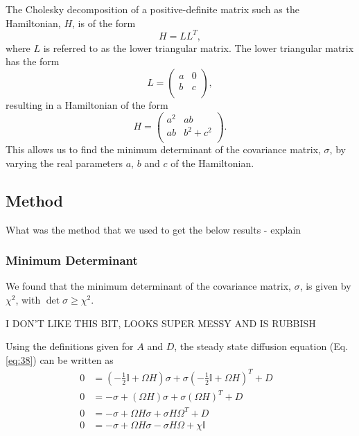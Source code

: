 \documentclass[11pt,a4paper]{article}
\numberwithin{equation}{section}
\begin{document}
	The Cholesky decomposition of a positive-definite matrix such as the Hamiltonian, $H$, is of the form
	\begin{equation*}
	H = LL^{T},
	\end{equation*}
	where $L$ is referred to as the lower triangular matrix. 
	The lower triangular matrix has the form \begin{equation}\label{eq:39}
	L = \begin{pmatrix}
	a & 0  \\
	b & c\\
	\end{pmatrix},
	\end{equation}
	resulting in a Hamiltonian of the form
	\begin{equation} \label{eq:41}
	H = \begin{pmatrix}
	a^{2} & ab  \\
	ab & b^{2}+c^{2}\\
	\end{pmatrix}.
	\end{equation}
	This allows us to find the minimum determinant of the covariance matrix, $\sigma$, by varying the real parameters $a$, $b$ and $c$ of the Hamiltonian.
	
	\color{red}\subsection{Method}\color{black}
	What was the method that we used to get the below results - explain
	
	\subsubsection{Minimum Determinant}
	
	We found that the minimum determinant of the covariance matrix, $\sigma$, is given by $\chi^{2}$, with $\det \sigma \geq \chi^{2}$. 
	
	\color{red}I DON'T LIKE THIS BIT, LOOKS SUPER MESSY AND IS RUBBISH \color{black}
	
	Using the definitions given for $A$ and $D$, the steady state diffusion equation (Eq. \ref{eq:38}) can be written as
	\begin{align}	
	0 &= (-\frac{1}{2}\mathbb{I} + \Omega H)\sigma +\sigma (-\frac{1}{2}\mathbb{I} + \Omega H)^{T} + D&\nonumber\\
	0 &= -\sigma + (\Omega H)\sigma +\sigma (\Omega H)^{T} + D& \nonumber\\
	0 &= -\sigma + \Omega H\sigma +\sigma H\Omega^{T} + D \nonumber&\\
	0 &= -\sigma + \Omega H\sigma -\sigma H\Omega + \chi \mathbb{I} & \tag*{ as $\sigma$ is symmetric.}
	\end{align}
	
\end{document}
